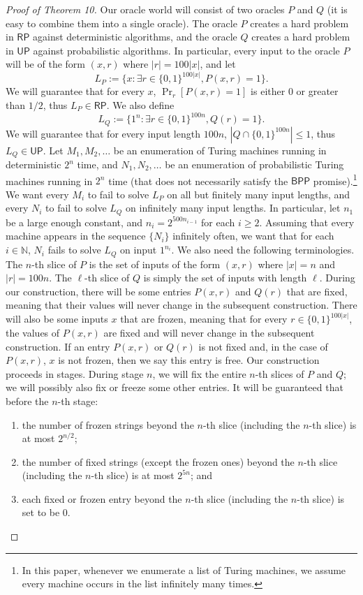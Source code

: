 \begin{proof}[Proof of Theorem 10]
Our oracle world will consist of two oracles $P$ and $Q$ (it is easy to combine them into a single oracle). The oracle $P$ creates a hard problem in $\mathsf{RP}$ against deterministic algorithms, and the oracle $Q$ creates a hard problem in $\mathsf{UP}$ against probabilistic algorithms. In particular, every input to the oracle $P$ will be of the form $(x,r)$ where $|r|=100|x|$, and let
\[L_P:=\{x:\exists r\in\{0,1\}^{100|x|},P(x,r)=1\}.\]
We will guarantee that for every $x$, $\Pr_r[P(x,r)=1]$ is either $0$ or greater than $1/2$, thus $L_P\in\mathsf{RP}$. We also define
\[L_Q:=\{1^n:\exists r\in\{0,1\}^{100n},Q(r)=1\}.\]
We will guarantee that for every input length $100n$, $|Q\cap\{0,1\}^{100n}|\leq1$, thus $L_Q\in\mathsf{UP}$.
Let $M_1,M_2,\ldots$ be an enumeration of Turing machines running in deterministic $2^n$ time, and $N_1,N_2,\ldots$ be an enumeration of probabilistic Turing machines running in $2^n$ time (that does not necessarily satisfy the $\mathsf{BPP}$ promise).\footnote{In this paper, whenever we enumerate a list of Turing machines, we assume every machine occurs in the list infinitely many times.} We want every $M_i$ to fail to solve $L_P$ on all but finitely many input lengths, and every $N_i$ to fail to solve $L_Q$ on infinitely many input lengths. In particular, let $n_1$ be a large enough constant, and $n_i=2^{500n_{i-1}}$ for each $i\geq2$. Assuming that every machine appears in the sequence $\{N_i\}$ infinitely often, we want that for each $i\in\mathbb N$, $N_i$ fails to solve $L_Q$ on input $1^{n_i}$.
We also need the following terminologies. The $n$-th slice of $P$ is the set of inputs of the form $(x,r)$ where $|x|=n$ and $|r|=100n$. The $\ell$-th slice of $Q$ is simply the set of inputs with length $\ell$. During our construction, there will be some entries $P(x,r)$ and $Q(r)$ that are fixed, meaning that their values will never change in the subsequent construction. There will also be some inputs $x$ that are frozen, meaning that for every $r\in\{0,1\}^{100|x|}$, the values of $P(x,r)$ are fixed and will never change in the subsequent construction. If an entry $P(x,r)$ or $Q(r)$ is not fixed and, in the case of $P(x,r)$, $x$ is not frozen, then we say this entry is free.
Our construction proceeds in stages. During stage $n$, we will fix the entire $n$-th slices of $P$ and $Q$; we will possibly also fix or freeze some other entries. It will be guaranteed that before the $n$-th stage:
\begin{enumerate}
\item the number of frozen strings beyond the $n$-th slice (including the $n$-th slice) is at most $2^{n/2}$;
\item the number of fixed strings (except the frozen ones) beyond the $n$-th slice (including the $n$-th slice) is at most $2^{5n}$; and
\item each fixed or frozen entry beyond the $n$-th slice (including the $n$-th slice) is set to be $0$.
\end{enumerate}

\end{proof}

